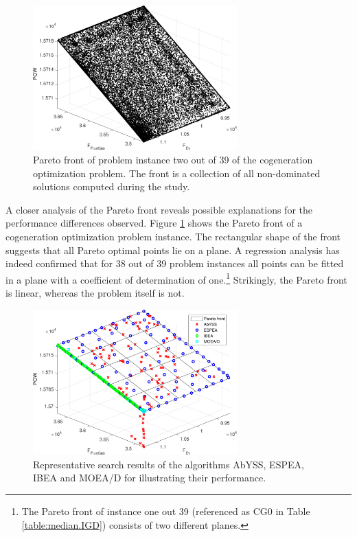 \begin{figure}
\centering
\includegraphics[width=0.7\textwidth]{figures/paretofront_cropped.pdf}
\caption{Pareto front of problem instance two out of 39 of the cogeneration optimization problem. The front is a collection of all non-dominated solutions computed during the study.}
\label{fig:paretofront}
\end{figure}

A closer analysis of the Pareto front reveals possible explanations for the performance differences observed. Figure \ref{fig:paretofront} shows the Pareto front of a cogeneration optimization problem instance. The rectangular shape of the front suggests that all Pareto optimal points lie on a plane. A regression analysis has indeed confirmed that for 38 out of 39 problem instances all points can be fitted in a plane with a coefficient of determination of one.\footnote{The Pareto front of instance one out 39 (referenced as CG0 in Table \ref{table:median.IGD}) consists of two different planes.} Strikingly, the Pareto front is linear, whereas the problem itself is not.

\begin{figure}
\centering
\includegraphics[width=0.7\textwidth]{figures/example1_cropped.pdf}
\caption{Representative search results of the algorithms AbYSS, ESPEA, IBEA and MOEA/D for illustrating their performance.}
\label{fig:exruns1}
\end{figure}

